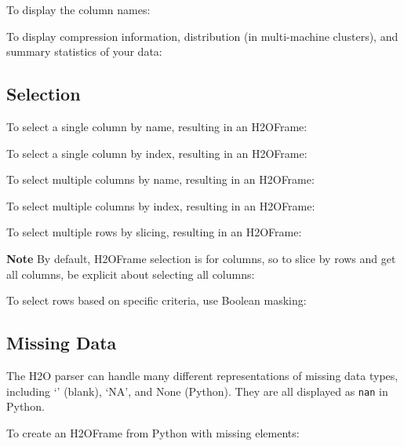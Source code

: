 {To display the column names:


To display compression information, distribution (in multi-machine clusters), and summary statistics of your data:



\subsection{Selection}
To select a single column by name, resulting in an H2OFrame:


To select a single column by index, resulting in an H2OFrame:


To select multiple columns by name, resulting in an H2OFrame:


To select multiple columns by index, resulting in an H2OFrame:


To select multiple rows by slicing, resulting in an H2OFrame: 

\textbf{Note} By default, H2OFrame selection is for columns, so to slice by rows
and get all columns, be explicit about selecting all columns:


\newpage

To select rows based on specific criteria, use Boolean masking:



\subsection{Missing Data}
The H2O parser can handle many different representations of missing data types, including `' (blank),
`NA',  and None (Python).  They are all displayed as \texttt{nan} in Python.

To create an H2OFrame from Python with missing elements:


}

